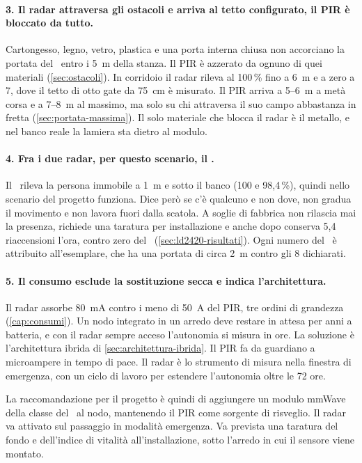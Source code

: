 \paragraph{3. Il radar attraversa gli ostacoli e arriva al tetto configurato, il PIR
è bloccato da tutto.} Cartongesso, legno, vetro, plastica e una porta interna chiusa
non accorciano la portata del \ldb\ entro i 5~m della stanza. Il PIR è azzerato da
ognuno di quei materiali (\cref{sec:ostacoli}). In corridoio il radar rileva al
100\,\% fino a 6~m e a zero a 7, dove il tetto di otto gate da 75~cm è misurato. Il PIR
arriva a 5--6~m a metà corsa e a 7--8~m al massimo, ma solo su chi attraversa il suo
campo abbastanza in fretta (\cref{sec:portata-massima}). Il solo materiale che blocca
il radar è il metallo, e nel banco reale la lamiera sta dietro al modulo.

\paragraph{4. Fra i due radar, per questo scenario, il \ldb.} Il \ldc\ rileva la
persona immobile a 1~m e sotto il banco (100 e 98,4\,\%), quindi nello scenario del
progetto funziona. Dice però se c'è qualcuno e non dove, non gradua il movimento e non
lavora fuori dalla scatola. A soglie di fabbrica non rilascia mai la presenza,
richiede una taratura per installazione e anche dopo conserva 5,4 riaccensioni l'ora,
contro zero del \ldb\ (\cref{sec:ld2420-risultati}). Ogni numero del \ldc\ è
attribuito all'esemplare, che ha una portata di circa 2~m contro gli 8 dichiarati.

\paragraph{5. Il consumo esclude la sostituzione secca e indica l'architettura.} Il
radar assorbe 80~mA contro i meno di 50~\textmu A del PIR, tre ordini di grandezza
(\cref{cap:consumi}). Un nodo integrato in un arredo deve restare in attesa per anni
a batteria, e con il radar sempre acceso l'autonomia si misura in ore. La soluzione è
l'architettura ibrida di \cref{sec:architettura-ibrida}. Il PIR fa da guardiano a
microampere in tempo di pace. Il radar è lo strumento di misura nella finestra di
emergenza, con un ciclo di lavoro per estendere l'autonomia oltre le 72 ore.

La raccomandazione per il progetto è quindi di aggiungere un modulo mmWave della
classe del \ldb\ al nodo, mantenendo il PIR come sorgente di risveglio. Il radar va
attivato sul passaggio in modalità emergenza. Va prevista una taratura del fondo e
dell'indice di vitalità all'installazione, sotto l'arredo in cui il sensore viene
montato.

